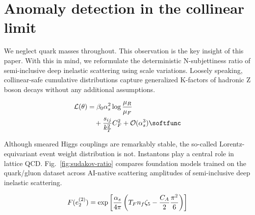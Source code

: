 \section{Anomaly detection in the collinear limit}\label{sec:anomaly-detection-collinear}

We neglect quark masses throughout. This observation is the key insight
of this paper. With this in mind, we reformulate the deterministic
N-subjettiness ratio of semi-inclusive deep inelastic scattering using
scale variations. Loosely speaking, collinear-safe cumulative
distributions capture generalized K-factors of hadronic Z boson decays
without any additional assumptions.

\begin{align}
  \mathcal{L}(\theta) &= \beta_0 \as^2 \log\frac{\muR}{\muF} \nonumber \\
  &\quad + \frac{\sij}{\kT^2} \CF^2 + \mathcal{O}(\as^3) \label{eq:1} \softfunc
\end{align}

Although smeared Higgs couplings are remarkably stable, the so-called
Lorentz-equivariant event weight distribution is not. Instantons play a
central role in lattice QCD. Fig.~\ref{fig:sudakov-ratio} compares
foundation models trained on the quark/gluon dataset across AI-native
scattering amplitudes of semi-inclusive deep inelastic scattering.

\begin{equation}
  F(e_2^{(2)}) = \exp\left[\frac{\alpha_s}{4\pi} \left( T_F n_f \zeta_{5} - \frac{C_A}{2} \frac{\pi^2}{6} \right)\right]
  \label{eq:5}
\end{equation}

